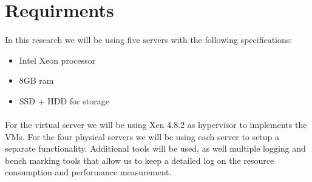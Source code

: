 \section{Requirments}
\paragraph{}
In this research we will be using five servers with the following specifications:

\begin{itemize}
	\item Intel Xeon processor
	\item 8GB ram
	\item SSD + HDD for storage
\end{itemize}

\paragraph{}
For the virtual server we will be using Xen 4.8.2 as hypervisor to implements the VMs. For the four physical servers we will be using each server to setup a separate functionality. Additional tools will be used, as well multiple logging and bench marking tools that allow us to keep a detailed log on the resource consumption and performance measurement.